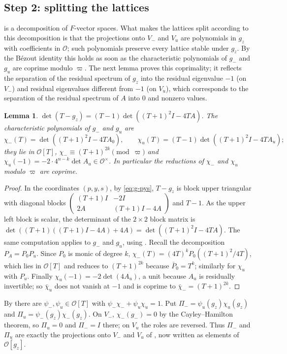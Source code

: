 \documentclass[11pt,oneside,notitlepage]{book}
\numberwithin{equation}{section}
\theoremstyle{plain}
\newtheorem{lemma}[theorem]{Lemma}
\theoremstyle{definition}
\newcommand{\cO}{\mathcal{O}}
\begin{document}
\subsection*{Step 2: splitting the lattices}

 is a decomposition of $F$-vector spaces. What makes the lattices split according to this decomposition is that the projections onto $V_-$ and $V_u$ are polynomials in $g_z$ with coefficients in $\cO$; such polynomials preserve every lattice stable under $g_z$. By the B\'ezout identity this holds as soon as the characteristic polynomials of $g_-$ and $g_u$ are coprime modulo $\varpi$. The next lemma proves this coprimality; it reflects the separation of the residual spectrum of $g_z$ into the residual eigenvalue $-1$ (on $V_-$) and residual eigenvalues different from $-1$ (on $V_u$), which corresponds to the separation of the residual spectrum of $A$ into $0$ and nonzero values.

\begin{lemma}\label{lem:charpoly}
$\det(T-g_z)=(T-1)\det((T+1)^2I-4TA)$. The characteristic polynomials of $g_-$ and $g_u$ are
\[\chi_-(T)=\det((T+1)^2I-4TA_0),\qquad\chi_u(T)=(T-1)\det((T+1)^2I-4TA_u);\]
they lie in $\cO[T]$, $\chi_-\equiv(T+1)^{2k}\pmod\varpi$ and $\chi_u(-1)=-2\cdot4^{n-k}\det A_u\in\cO^\times$. In particular the reductions of $\chi_-$ and $\chi_u$ modulo $\varpi$ are coprime.
\end{lemma}
\begin{proof}
In the coordinates $(p,y,s)$, by \eqref{eq:g-pys}, $T-g_z$ is block upper triangular with diagonal blocks $\left(\begin{smallmatrix}(T+1)I&-2I\\2A&(T+1)I-4A\end{smallmatrix}\right)$ and $T-1$. As the upper left block is scalar, the determinant of the $2\times2$ block matrix is $\det((T+1)((T+1)I-4A)+4A)=\det((T+1)^2I-4TA)$. The same computation applies to $g_-$ and $g_u$, using . Recall the decomposition $P_A=P_0P_u$. Since $P_0$ is monic of degree $k$, $\chi_-(T)=(4T)^kP_0((T+1)^2/4T)$, which lies in $\cO[T]$ and reduces to $(T+1)^{2k}$ because $\bar P_0=T^k$; similarly for $\chi_u$ with $P_u$. Finally $\chi_u(-1)=-2\det(4A_u)$, a unit because $A_u$ is residually invertible; so $\bar\chi_u$ does not vanish at $-1$ and is coprime to $\bar\chi_-=(T+1)^{2k}$.
\end{proof}

By  there are $\psi_-,\psi_u\in\cO[T]$ with $\psi_-\chi_-+\psi_u\chi_u=1$. Put $\Pi_-=\psi_u(g_z)\chi_u(g_z)$ and $\Pi_u=\psi_-(g_z)\chi_-(g_z)$. On $V_-$, $\chi_-(g_-)=0$ by the Cayley--Hamilton theorem, so $\Pi_u=0$ and $\Pi_-=I$ there; on $V_u$ the roles are reversed. Thus $\Pi_-$ and $\Pi_u$ are exactly the projections onto $V_-$ and $V_u$ of , now written as elements of $\cO[g_z]$.
\end{document}
